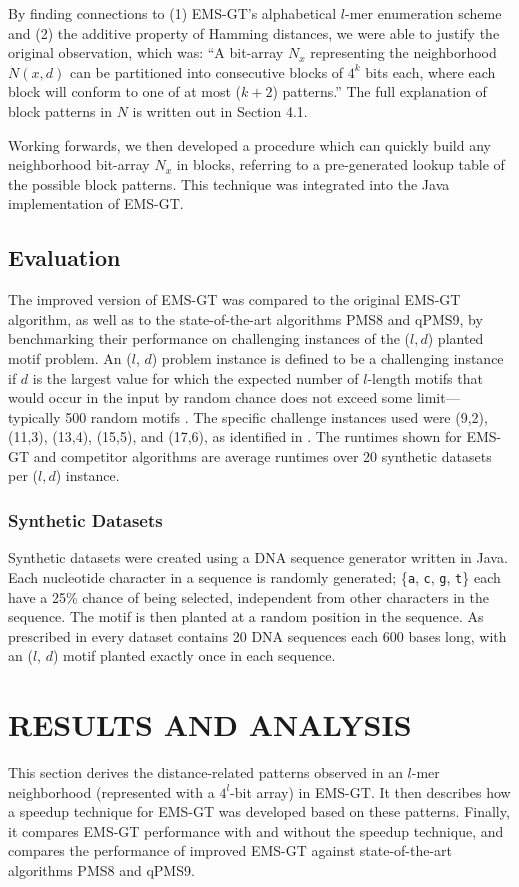 \documentclass[oneside,12pt]{DISCSthesis}
\begin{document}
{		By finding connections to (1) EMS-GT's alphabetical $l$-mer enumeration scheme and (2) the additive property of Hamming distances, we were able to justify the original observation, which was: ``A bit-array $N_x$ representing the neighborhood $N(x,d)$ can be partitioned into consecutive blocks of $4^k$ bits each, where each block will conform to one of at most ($k+2$) patterns.'' The full explanation of block patterns in $N$ is written out in Section 4.1.
		
		Working forwards, we then developed a procedure which can quickly build any neighborhood bit-array $N_x$ in blocks, referring to a pre-generated lookup table of the possible block patterns. This technique was integrated into the Java implementation of EMS-GT.

	\section{Evaluation}
		The improved version of EMS-GT was compared to the original EMS-GT algorithm, as well as to the state-of-the-art algorithms PMS8 and qPMS9, by benchmarking their performance on challenging instances of the ($l, d$) planted motif problem.
		An ($l$, $d$) problem instance is defined to be a challenging instance if $d$ is the largest value for which the expected number of $l$-length motifs that would occur in the input by random chance does not exceed some limit---typically 500 random motifs \cite{pms2015}. The specific challenge instances used were (9,2), (11,3), (13,4), (15,5), and (17,6), as identified in \cite{pms2015,pms2007}. The runtimes shown for EMS-GT and competitor algorithms are average runtimes over 20 synthetic datasets per ($l,d$) instance.

	\subsection{Synthetic Datasets}
		Synthetic datasets were created using a DNA sequence generator written in Java. Each nucleotide character in a sequence is randomly generated; \{\texttt{a}, \texttt{c}, \texttt{g}, \texttt{t}\} each have a 25\% chance of being selected, independent from other characters in the sequence.
		The motif is then planted at a random position in the sequence. As prescribed in \cite{pevzner2000combinatorial} every dataset contains 20 DNA sequences each 600 bases long, with an ($l$, $d$) motif planted exactly once in each sequence.

\chapter{RESULTS AND ANALYSIS}
	This section derives the distance-related patterns observed in an $l$-mer neighborhood (represented with a $4^l$-bit array) in EMS-GT. It then describes how a speedup technique for EMS-GT was developed based on these patterns. Finally, it compares EMS-GT performance with and without the speedup technique, and compares the performance of improved EMS-GT against state-of-the-art algorithms PMS8 and qPMS9.

}
\end{document}
